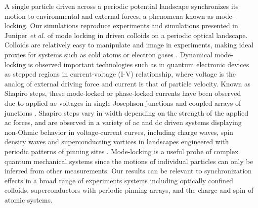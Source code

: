 \documentclass[twocolumn,preprintnumbers,amsmath,amssymb,aps,prx]{revtex4}
\begin{document}
A single particle driven across a periodic potential landscape 
synchronizes its motion %
to environmental and external forces,
a phenomena known as mode-locking.  
Our simulations reproduce experiments and simulations presented in 
Juniper {\it et al.} \cite{Juniper2015, Juniper2017}
of 
mode locking in
driven colloids on a
periodic optical landscape.
Colloids are 
relatively easy to 
manipulate and image in experiments,
making ideal proxies 
for systems %
such as cold atoms or electron gases \cite{Grier2003}.
Dynamical mode-locking %
is %
observed important technologies such as 
in quantum electronic
devices %
as 
stepped regions in current-voltage (I-V) relationship,
where voltage is the analog of external driving force
and current is that of particle velocity.
Known as Shapiro steps, %
these mode-locked or phase-locked currents  
have been observed due to applied ac voltages in 
single Josephson junctions \cite{Shapiro1963, Golubov2004} and
coupled arrays of junctions \cite{Benz1990}.
Shapiro steps vary in width depending on the strength of the
applied ac forces,
and are observed in a variety of ac and dc driven systems
displaying
non-Ohmic behavior in voltage-current curves,
including
charge waves, spin density waves
and superconducting vortices in landscapes 
engineered with periodic patterns of pinning sites \cite{Reichhardt2000}.
Mode-locking is a useful probe 
of complex quantum mechanical systems
since the motions of individual particles can only be inferred
from other measurements.
Our results can be relevant 
to synchronization effects
in a broad range of experiments systems
including optically confined colloids,
superconductors with periodic pinning arrays, 
and the charge and spin of atomic systems.
\end{document}
